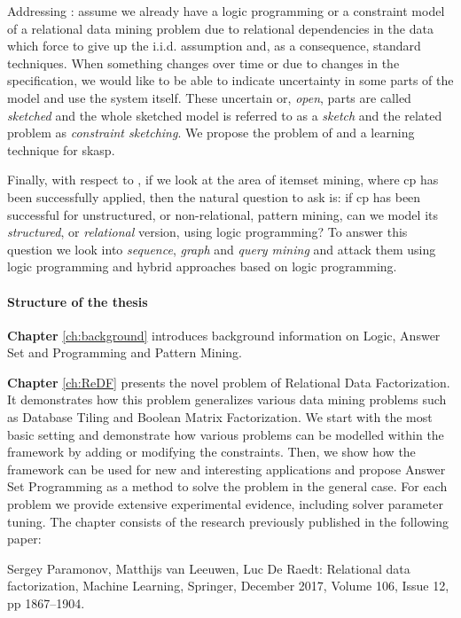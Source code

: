 Addressing \cthree: assume we already have a logic programming or a
constraint model of a relational
data mining problem due to relational dependencies in the data which 
force to give up the i.i.d. assumption and, as a consequence,
standard techniques. When something changes over time or due to changes in the specification, we would like
to be able to indicate uncertainty in some parts of the model and use
the system itself. These
uncertain or, \textit{open}, parts are called \textit{sketched} and
the whole sketched model is referred to as a \textit{sketch} and the related
problem as \textit{constraint sketching}. We propose the problem of and
a learning technique for \acrlong{skasp}.


Finally, with respect to \cfour, if we look at the area of itemset mining, where \acrlong{cp}
has been successfully applied, then the natural question to ask is:
if \acrshort{cp} has been successful for unstructured, or
non-relational, pattern mining, can we model its \textit{structured},
or \textit{relational} version, using logic programming? To answer
this question we look into \textit{sequence}, \textit{graph} and
\textit{query mining} and attack them using logic programming and
hybrid approaches based on logic programming.

\paragraph{Structure of the thesis}
\textbf{Chapter} \ref{ch:background} introduces background information
on Logic, Answer Set and Programming and Pattern Mining.

\textbf{Chapter} \ref{ch:ReDF} presents the novel problem of Relational Data
Factorization. It demonstrates how this problem generalizes various
data mining problems such as Database Tiling and Boolean Matrix
Factorization. We start with the most basic setting and demonstrate
how various problems can be modelled within the framework by adding
or modifying the constraints. Then, we show how the framework can be
used for new and interesting applications and propose Answer Set
Programming as a method to solve the problem in the general case.
For each problem we provide extensive experimental evidence,
including solver parameter tuning. The chapter consists of the
research previously published in the following paper:

\begin{addmargin}[2em]{2em}

Sergey Paramonov,  Matthijs van Leeuwen, Luc De Raedt: Relational data
factorization, Machine Learning, Springer, December 2017, Volume 106,
    Issue 12, pp 1867–1904.

\end{addmargin}



